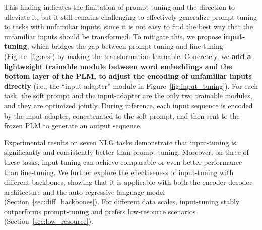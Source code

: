 This finding indicates the limitation of prompt-tuning and the direction to alleviate it, but it still remains challenging to effectively generalize prompt-tuning to tasks with unfamiliar inputs, since it is not easy to find the best way that the unfamiliar inputs should be transformed. To mitigate this, we propose \textbf{input-tuning}, which bridges the gap between prompt-tuning and fine-tuning (Figure~\ref{fig:res}) by making the transformation learnable. Concretely, we \textbf{add a lightweight trainable module between word embeddings and the bottom layer of the PLM, to adjust the encoding of unfamiliar inputs directly} (i.e., the ``input-adapter'' module in Figure~\ref{fig:input_tuning}).
For each task, the soft prompt and the input-adapter are the only two trainable modules, and they are optimized jointly. During inference, each input sequence is encoded by the input-adapter, concatenated to the soft prompt, and then sent to the frozen PLM to generate an output sequence.

Experimental results on seven NLG tasks demonstrate that input-tuning is significantly and consistently better than prompt-tuning. Moreover, on three of these tasks, input-tuning can achieve comparable or even better performance than fine-tuning. We further explore the effectiveness of input-tuning with different backbones, showing that it is applicable with both the encoder-decoder architecture and the auto-regressive language model (Section~\ref{sec:diff_backbones}).
For different data scales, input-tuning stably outperforms prompt-tuning and prefers low-resource scenarios (Section~\ref{sec:low_resource}).

